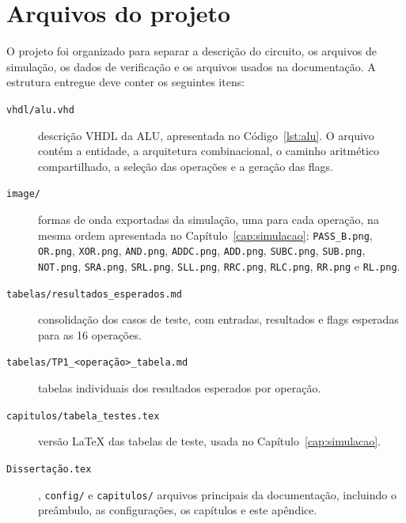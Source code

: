 \chapter{Arquivos do projeto}
\label{ap:arquivos}

O projeto foi organizado para separar a descrição do circuito, os arquivos de
simulação, os dados de verificação e os arquivos usados na documentação. A
estrutura entregue deve conter os seguintes itens:

\begin{description}
  \item[\texttt{vhdl/alu.vhd}] descrição VHDL da ALU, apresentada no
    Código~\ref{lst:alu}. O arquivo contém a entidade, a arquitetura
    combinacional, o caminho aritmético compartilhado, a seleção das operações
    e a geração das flags.
  \item[\texttt{image/}] formas de onda exportadas da simulação, uma para
    cada operação, na mesma ordem apresentada no Capítulo~\ref{cap:simulacao}:
    \texttt{PASS\_B.png}, \texttt{OR.png}, \texttt{XOR.png},
    \texttt{AND.png}, \texttt{ADDC.png}, \texttt{ADD.png},
    \texttt{SUBC.png}, \texttt{SUB.png}, \texttt{NOT.png},
    \texttt{SRA.png}, \texttt{SRL.png}, \texttt{SLL.png},
    \texttt{RRC.png}, \texttt{RLC.png}, \texttt{RR.png} e
    \texttt{RL.png}.
  \item[\texttt{tabelas/resultados\_esperados.md}] consolidação dos casos de
    teste, com entradas, resultados e flags esperadas para as 16 operações.
  \item[\texttt{tabelas/TP1\_<operação>\_tabela.md}] tabelas individuais
    dos resultados esperados por operação.
  \item[\texttt{capitulos/tabela\_testes.tex}] versão LaTeX das tabelas de
    teste, usada no Capítulo~\ref{cap:simulacao}.
  \item[\texttt{Dissertação.tex}], \texttt{config/} e \texttt{capitulos/}
    arquivos principais da documentação, incluindo o preâmbulo, as
    configurações, os capítulos e este apêndice.
\end{description}

